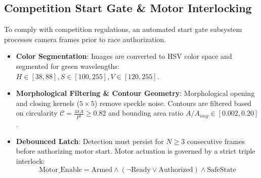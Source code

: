 \documentclass[conference]{IEEEtran}
\begin{document}
\subsection{Competition Start Gate \& Motor Interlocking}
To comply with competition regulations, an automated start gate subsystem processes camera frames prior to race authorization.
\begin{itemize}
    \item \textbf{Color Segmentation}: Images are converted to HSV color space and segmented for green wavelengths: $H \in [38, 88], S \in [100, 255], V \in [120, 255]$.
    \item \textbf{Morphological Filtering \& Contour Geometry}: Morphological opening and closing kernels ($5 \times 5$) remove speckle noise. Contours are filtered based on circularity $\mathcal{C} = \frac{4\pi A}{P^2} \ge 0.82$ and bounding area ratio $A/A_{img} \in [0.002, 0.20]$.
    \item \textbf{Debounced Latch}: Detection must persist for $N \ge 3$ consecutive frames before authorizing motor start. Motor actuation is governed by a strict triple interlock:
          \begin{equation}
              \text{Motor\_Enable} = \text{Armed} \land (\neg \text{Ready} \lor \text{Authorized}) \land \text{SafeState}
          \end{equation}
\end{itemize}
\end{document}
